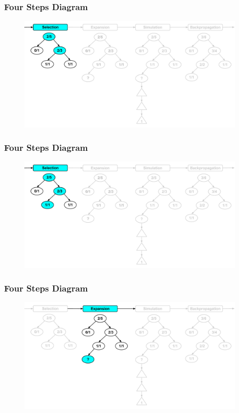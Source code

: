 \documentclass{beamer}
\begin{document}
\begin{frame}[fragile]
\frametitle{Four Steps Diagram}
\begin{figure}[h]
	\includegraphics[width=11cm]{Diagrams/FourSteps/MCTSFourStepProcessOneTwo.pdf}
	\centering
\end{figure}
\end{frame}

\begin{frame}[fragile]
\frametitle{Four Steps Diagram}
\begin{figure}[h]
	\includegraphics[width=11cm]{Diagrams/FourSteps/MCTSFourStepProcessOneThree.pdf}
	\centering
\end{figure}
\end{frame}

\begin{frame}[fragile]
\frametitle{Four Steps Diagram}
\begin{figure}[h]
	\includegraphics[width=11cm]{Diagrams/FourSteps/MCTSFourStepProcessTwo.pdf}
	\centering
\end{figure}
\end{frame}
\end{document}
